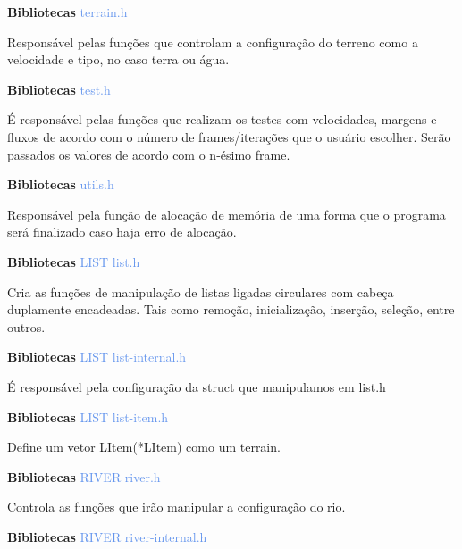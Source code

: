 \documentclass[a4paper,12pt]{article}
\begin{document}
{\Large \textcolor{NavyBlue}{ \textbf{Bibliotecas  }}}{\large \textcolor{CornflowerBlue}{  terrain.h}}
\bigskip

Responsável pelas funções que controlam a configuração do terreno como a velocidade e tipo, no caso terra ou água.
\bigskip
\bigskip
\bigskip

{\Large \textcolor{NavyBlue}{ \textbf{Bibliotecas  }}}{\large \textcolor{CornflowerBlue}{  test.h}}
\bigskip

É responsável pelas funções que realizam os testes com velocidades, margens e fluxos de acordo com o número de frames/iterações que o usuário escolher.
Serão passados os valores de acordo com o n-ésimo frame.


\newpage %

{\Large \textcolor{NavyBlue}{ \textbf{Bibliotecas  }}}{\large \textcolor{CornflowerBlue}{  utils.h}}
\bigskip

Responsável pela função de alocação de memória de uma forma que o programa será finalizado caso haja erro de alocação.
\bigskip
\bigskip
\bigskip

{\Large \textcolor{NavyBlue}{ \textbf{Bibliotecas  }}}{\large \textcolor{CornflowerBlue}{  LIST  list.h}}
\bigskip

Cria as funções de manipulação de listas ligadas circulares com cabeça duplamente encadeadas. Tais como remoção, inicialização, inserção, seleção, entre outros.
\bigskip
\bigskip
\bigskip

{\Large \textcolor{NavyBlue}{ \textbf{Bibliotecas  }}}{\large \textcolor{CornflowerBlue}{  LIST  list-internal.h}}
\bigskip

É responsável pela configuração da struct que manipulamos em list.h
\bigskip
\bigskip
\bigskip

{\Large \textcolor{NavyBlue}{ \textbf{Bibliotecas  }}}{\large \textcolor{CornflowerBlue}{  LIST  list-item.h}}
\bigskip

Define um vetor LItem(*LItem) como um terrain.
\bigskip
\bigskip
\bigskip

{\Large \textcolor{NavyBlue}{ \textbf{Bibliotecas  }}}{\large \textcolor{CornflowerBlue}{  RIVER  river.h}}
\bigskip

Controla as funções que irão manipular a configuração do rio.
\bigskip
\bigskip
\bigskip

{\Large \textcolor{NavyBlue}{ \textbf{Bibliotecas  }}}{\large \textcolor{CornflowerBlue}{  RIVER  river-internal.h}}
\bigskip
\end{document}
